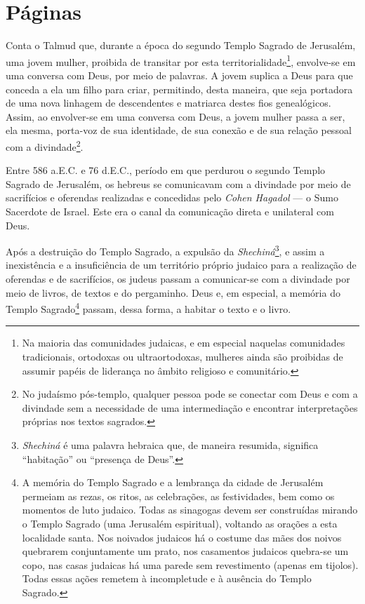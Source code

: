 \chapter{Páginas}



\noindent{}Conta o Talmud que, durante a época do segundo Templo Sagrado de
Jerusalém, uma jovem mulher, proibida de transitar por esta
territorialidade\footnote{Na maioria das comunidades judaicas, e em
  especial naquelas comunidades tradicionais, ortodoxas ou
  ultraortodoxas, mulheres ainda são proibidas de assumir papéis de
  liderança no âmbito religioso e comunitário.}, envolve-se em uma
conversa com Deus, por meio de palavras. A jovem suplica a Deus para que
conceda a ela um filho para criar, permitindo, desta maneira, que seja
portadora de uma nova linhagem de descendentes e matriarca destes fios
genealógicos. Assim, ao envolver-se em uma conversa com Deus, a jovem
mulher passa a ser, ela mesma, porta-voz de sua identidade, de sua
conexão e de sua relação pessoal com a divindade\footnote{No judaísmo
  pós-templo, qualquer pessoa pode se conectar com Deus e com a
  divindade sem a necessidade de uma intermediação e encontrar
  interpretações próprias nos textos sagrados.}.

Entre 586 a.E.C. e 76 d.E.C., período em que perdurou o segundo Templo
Sagrado de Jerusalém, os hebreus se comunicavam com a divindade por meio
de sacrifícios e oferendas realizadas e concedidas pelo \emph{Cohen
Hagadol} --- o Sumo Sacerdote de Israel. Este era o canal da comunicação
direta e unilateral com Deus.

Após a destruição do Templo Sagrado, a expulsão da
\emph{Shechiná}\footnote{\emph{Shechiná} é uma palavra hebraica que, de
  maneira resumida, significa ``habitação'' ou ``presença de Deus''.}, e
assim a inexistência e a insuficiência de um território próprio judaico
para a realização de oferendas e de sacrifícios, os judeus passam a
comunicar-se com a divindade por meio de livros, de textos e do
pergaminho. Deus e, em especial, a memória do Templo Sagrado\footnote{A
  memória do Templo Sagrado e a lembrança da cidade de Jerusalém
  permeiam as rezas, os ritos, as celebrações, as festividades, bem como
  os momentos de luto judaico. Todas as sinagogas devem ser construídas
  mirando o Templo Sagrado (uma Jerusalém espiritual), voltando as
  orações a esta localidade santa. Nos noivados judaicos há o costume
  das mães dos noivos quebrarem conjuntamente um prato, nos casamentos
  judaicos quebra-se um copo, nas casas judaicas há uma parede sem
  revestimento (apenas em tijolos). Todas essas ações remetem à
  incompletude e à ausência do Templo Sagrado.} passam, dessa forma, a
habitar o texto e o livro.

